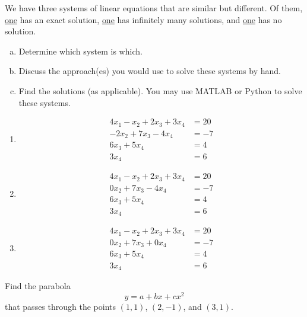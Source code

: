 \documentclass[12pt, answers]{exam}
\begin{document}
\begin{questions}
\vspace*{3em}
\addpoints
\question[10] We have three systems of linear equations that are similar but different. Of them, \underline{one} has an exact solution, \underline{one} has infinitely many solutions, and \underline{one} has no solution. 
%
\begin{enumerate}[a.]
\item Determine which system is which.
\item Discuss the approach(es) you would use to solve these systems by hand.
\item Find the solutions (as applicable). You may use MATLAB or Python to solve these systems. 
\end{enumerate}
%
\begin{enumerate}
\item 
\begin{align}
4 x_1 -   x_2 + 2 x_3 + 3 x_4 &= 20 \nonumber \\
      - 2 x_2 + 7 x_3 - 4 x_4 &= -7 \nonumber \\
                6 x_3 + 5 x_4 &= 4  \nonumber \\
                        3 x_4 &= 6  \nonumber
\end{align}

\item 
\begin{align}
4 x_1 -   x_2 + 2 x_3 + 3 x_4 &= 20 \nonumber \\
        0 x_2 + 7 x_3 - 4 x_4 &= -7 \nonumber \\
                6 x_3 + 5 x_4 &= 4  \nonumber \\
                        3 x_4 &= 6  \nonumber
\end{align}

\item 
\begin{align}
4 x_1 -   x_2 + 2 x_3 + 3 x_4 &= 20 \nonumber \\
        0 x_2 + 7 x_3 + 0 x_4 &= -7 \nonumber \\
                6 x_3 + 5 x_4 &= 4  \nonumber \\
                        3 x_4 &= 6  \nonumber
\end{align}
\end{enumerate}


\vspace*{3em}
\addpoints
\question[10] Find the parabola
\[ y = a + bx + cx^2\]
that passes through the points $(1,1)$, $(2,-1)$, and $(3,1)$. 


\end{questions}
\end{document}
